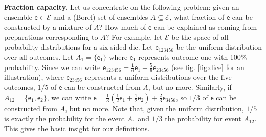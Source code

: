 \documentclass[10pt,twocolumn, nofootinbib]{revtex4-2}
\newcommand{\ens}[1][e] {\mathsf{#1}} %
\newcommand{\Ens}[1][E] {\mathcal{#1}} %
\begin{document}
\textbf{Fraction capacity.} Let us concentrate on the following problem: given an ensemble $\ens \in \Ens$ and a (Borel) set of ensembles $A \subseteq \Ens$, what fraction of $\ens$ can be constructed by a mixture of $A$? How much of $\ens$ can be explained as coming from preparations corresponding to $A$? For example, let $\Ens$ be the space of all probability distributions for a six-sided die. Let $\ens_{123456}$ be the uniform distribution over all outcomes. Let $A_1 = \{\ens_1\}$ where $\ens_1$ represents outcome one with 100\% probability. Since we can write $\ens_{123456} = \frac{1}{6} \ens_{1} + \frac{5}{6} \ens_{23456}$ (see fig. \ref{fig:dice} for an illustration), where $\ens_{23456}$ represents a uniform distributions over the five outcomes, $1/5$ of $\ens$ can be constructed from $A$, but no more. Similarly, if $A_{12} = \{\ens_{1},\ens_{2}\}$, we can write $\ens = \frac{1}{3} \left(\frac{1}{2} \ens_1 + \frac{1}{2} \ens_2 \right)  + \frac{2}{3} \ens_{3456}$, so $1/3$ of $\ens$ can be constructed from $A$, but no more. Note that, given the uniform distribution, $1/5$ is exactly the probability for the event $A_1$ and $1/3$ the probability for event $A_{12}$. This gives the basic insight for our definitions.
\end{document}
